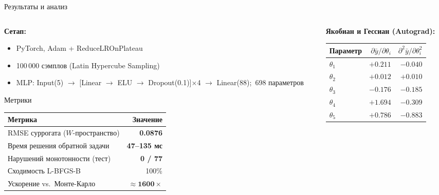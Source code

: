 \documentclass[11pt, aspectratio=169]{beamer}
\begin{document}
\begin{frame}[shrink=5]{Результаты и анализ}
  \begin{columns}[T]
    \begin{column}{0.50\textwidth}
      \textbf{Сетап:}
      \begin{itemize}\small
        \item PyTorch, Adam + ReduceLROnPlateau
        \item 100\,000 сэмплов (Latin Hypercube Sampling)
        \item MLP: Input(5) $\!\to\!$
              [Linear $\to$ ELU $\to$ Dropout(0.1)]$\times$4
              $\!\to\!$ Linear(88); \,698 параметров
      \end{itemize}

      \medskip
      \begin{block}{Метрики}
        \small
        \begin{tabular}{@{}lr@{}}
          \toprule
          Метрика & Значение \\ \midrule
          RMSE суррогата ($W$-пространство) & \textbf{0.0876} \\
          Время решения обратной задачи     & \textbf{47--135 мс} \\
          Нарушений монотонности (тест)     & \textbf{0 / 77} \\
          Сходимость L-BFGS-B               & 100\% \\
          Ускорение vs.\ Монте-Карло        & $\approx\mathbf{1600\times}$ \\
          \bottomrule
        \end{tabular}
      \end{block}
    \end{column}

    \begin{column}{0.47\textwidth}
      \textbf{Якобиан и Гессиан (Autograd):}
      \medskip
      \begin{center}\small
      \begin{tabular}{@{}lrr@{}}
        \toprule
        Параметр & $\partial\bar y/\partial\theta_i$
                 & $\partial^2\bar y/\partial\theta_i^2$ \\ \midrule
        $\theta_1$ & $+0.211$ & $-0.040$ \\
        $\theta_2$ & $+0.012$ & $+0.010$ \\
        $\theta_3$ & $-0.176$ & $-0.185$ \\
        $\theta_4$ & {\color{mlorange}$+1.694$} & $-0.309$ \\
        $\theta_5$ & $+0.786$ & $-0.883$ \\
        \bottomrule
      \end{tabular}
      \end{center}


\end{column}
\end{columns}
\end{frame}
\end{document}

